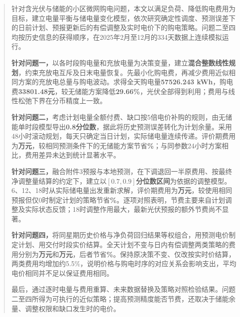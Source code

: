 


\begin{abstract}
针对含光伏与储能的小区微网购电问题，本文以满足负荷、降低购电费用为目标，建立电量平衡与储电量变化模型，依次研究确定性调度、预测误差下的日前计划、预报更新后的有偿调整及实时电价下的购电策略。问题二至四均按历史信息的获得顺序，在2025年2月至12月的334天数据上连续模拟运行。

\textbf{针对问题一，}以各时段购电量和充放电量为决策变量，建立\textbf{混合整数线性规划}，约束充放电互斥及日末电量恢复。先最小化购电费，再减少费用近似相同方案的充放电总量与购电波动。求得全天购电量\textbf{57526.243 kWh}，购电费\textbf{33801.48元}，较无储能方案降低\textbf{29.66\%}，光伏全部得到利用；费用与线性松弛下界在分币精度上一致。

\textbf{针对问题二，}考虑计划电量全额付费、缺口按5倍电价补购的规则，由无储能单时段模型导出\textbf{0.8分位数}，据此将历史预测误差转化为计划余量。采用48小时滚动规划，每天只确定当日计划，实际储电量连续传递。评价期费用为\textbf{\QTwoTotalCost 万元}，较相同预测条件下的无储能方案节省\textbf{\QTwoSaving\%}；与同参数24小时方案相比，费用差异未达到统计显著水平。

\textbf{针对问题三，}融合附件3预报与本地预测，在下调退回一半原费用、按最终净调整量结算的约定下，建立以\textbf{$[0.7,0.9]$分位数区间}为依据的调整模型。6、12、18时从实际储电量出发重新求解，评价期费用为\textbf{\QThreeTotalCost 万元}，较使用相同预报但仅0时制定计划的策略节省\textbf{\QThreeSavingPlanOnlyPercent\%}。逐项对照表明，节费主要来自计划调整及实际状态反馈；18时调整作用最大，最新光伏预报的额外节费尚不显著。

\textbf{针对问题四，}将同星期历史价格与净负荷回归结果等权组合，用预测电价制定计划、用交付时段实价结算。全天计划不变与日内有偿调整两类策略的费用分别为\textbf{\QFourTwoTotalCost 万元}和\textbf{\QFourThreeTotalCost 万元}，后者节省\textbf{\QFourThreeVsTwoPercent\%}。保持原决策不变、仅改按实时价结算，两类费用均增加约5.5\%，说明价格与购电时序的对应关系会影响支出，平均电价相同并不足以保证费用相同。

最后，通过逐时电量与费用重算、未来数据替换及策略对照检验结果。问题二至四所得为可执行的近似策略；提高预测精度能否节费，还取决于储能余量、调整权限和缺口发生时的电价。

\end{abstract}
